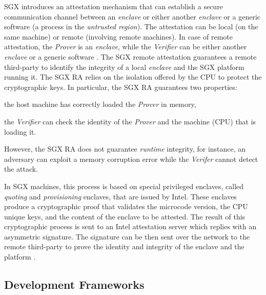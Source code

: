 SGX introduces an attestation mechanism \citep{anati2013innovative} that can
establish a secure communication channel between an \emph{enclave} or either 
another \emph{enclave} or a generic software (\eg a process in the 
\emph{untrusted region}).
The attestation can be local (on the same machine) or remote (involving remote 
machines).
In case of remote attestation, the \emph{Prover} is an \emph{enclave}, while 
the \emph{Verifier} can be either another \emph{enclave} or a generic software 
\citep{vill2017sgx}.
The SGX remote attestation guarantees a remote third-party to identify the 
integrity of a local \emph{enclave} and the SGX platform running it.
The SGX RA relies on the isolation offered by the CPU to protect the 
cryptographic keys. 
In particular, the SGX RA guarantees two properties:
\begin{enumerate*}[label=(\roman*)]
	\item the host machine has correctly loaded the \emph{Prover} in memory,
	\item the \emph{Verifier} can check the identity of the 
	\emph{Prover} and the machine (\ie CPU) that is loading it.
\end{enumerate*}
However, the SGX RA does not guarantee \emph{runtime} integrity, for instance, 
an adversary can exploit a memory corruption error while the 
\emph{Verifer} cannot detect the attack.

In SGX machines, this process is based on special privileged enclaves,
called \emph{quoting} and \emph{provisioning} enclaves, that are issued by
Intel.
These enclaves produce a cryptographic proof that validates the microcode
version, the CPU unique keys, and the content of the enclave to
be attested. The result of this cryptographic process is sent to an Intel
attestation server which replies with an asymmetric signature. The signature
can be then sent over the network to the remote third-party to prove the
identity and integrity of the enclave and the platform 
\citep{anati2013innovative}.

\subsection{Development Frameworks}
\label{ssec:development-frameworks}

